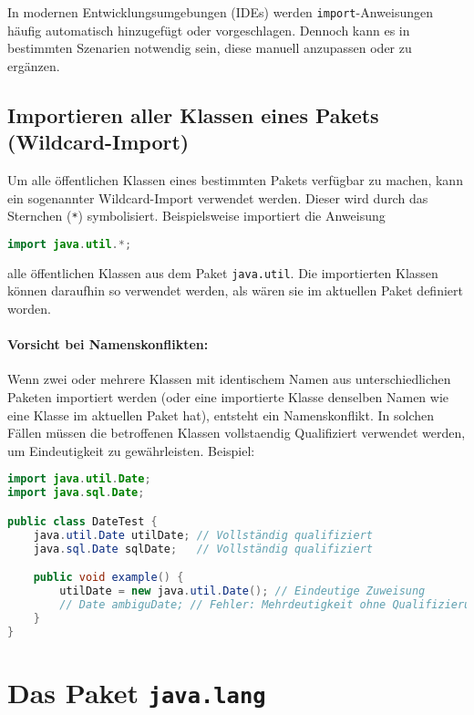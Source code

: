 In modernen Entwicklungsumgebungen (IDEs) werden \texttt{import}-Anweisungen häufig automatisch hinzugefügt oder vorgeschlagen. 
Dennoch kann es in bestimmten Szenarien notwendig sein, diese manuell anzupassen oder zu ergänzen.

\subsection{Importieren aller Klassen eines Pakets (Wildcard-Import)}
\label{ssec:wildcard_import}

Um alle öffentlichen Klassen eines bestimmten Pakets verfügbar zu machen, kann ein sogenannter Wildcard-Import verwendet werden. 
Dieser wird durch das Sternchen (\texttt{*}) symbolisiert. Beispielsweise importiert die Anweisung
\begin{lstlisting}[language=Java, caption={Wildcard-Import des java.util Pakets}]
import java.util.*;
\end{lstlisting}
alle öffentlichen Klassen aus dem Paket \texttt{java.util}. Die importierten Klassen können daraufhin so verwendet werden, 
als wären sie im aktuellen Paket definiert worden.

\paragraph{Vorsicht bei Namenskonflikten:}
Wenn zwei oder mehrere Klassen mit identischem Namen aus unterschiedlichen Paketen importiert werden 
(oder eine importierte Klasse denselben Namen wie eine Klasse im aktuellen Paket hat), entsteht ein Namenskonflikt. 
In solchen Fällen müssen die betroffenen Klassen \gls{vollstaendig Qualifiziert} verwendet werden, um Eindeutigkeit zu gewährleisten.
Beispiel:
\begin{lstlisting}[language=Java, caption={Umgang mit Namenskonflikten}]
import java.util.Date;
import java.sql.Date;

public class DateTest {
    java.util.Date utilDate; // Vollständig qualifiziert
    java.sql.Date sqlDate;   // Vollständig qualifiziert

    public void example() {
        utilDate = new java.util.Date(); // Eindeutige Zuweisung
        // Date ambiguDate; // Fehler: Mehrdeutigkeit ohne Qualifizierung
    }
}
\end{lstlisting}

\section{Das Paket \texttt{java.lang}}
\label{sec:java_lang}

